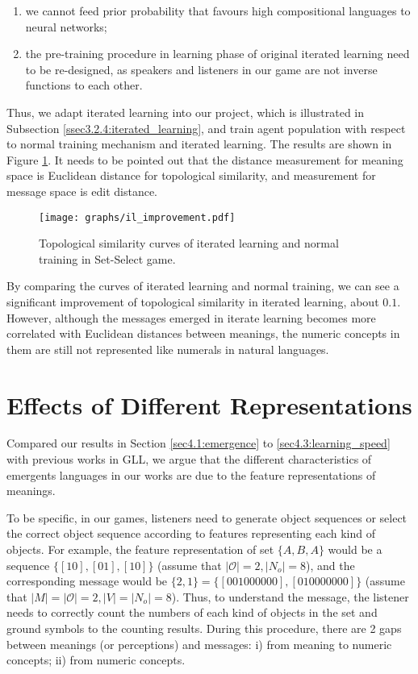 \begin{enumerate}
    \item we cannot feed prior probability that favours high compositional languages to neural networks;
    \item the pre-training procedure in learning phase of original iterated learning need to be re-designed, as speakers and listeners in our game are not inverse functions to each other.
\end{enumerate}

Thus, we adapt iterated learning into our project, which is illustrated in Subsection \ref{ssec3.2.4:iterated_learning}, and train agent population with respect to normal training mechanism and iterated learning. The results are shown in Figure \ref{fig4.4:il_improve}. It needs to be pointed out that the distance measurement for meaning space is Euclidean distance for topological similarity, and measurement for message space is edit distance.

\begin{figure}[!h]
    \centering
    \texttt{[image: graphs/il\_improvement.pdf]}
    \caption{Topological similarity curves of iterated learning and normal training in Set-Select game.}
    \label{fig4.4:il_improve}
\end{figure}

By comparing the curves of iterated learning and normal training, we can see a significant improvement of topological similarity in iterated learning, about $0.1$. However, although the messages emerged in iterate learning becomes more correlated with Euclidean distances between meanings, the numeric concepts in them are still not represented like numerals in natural languages.


\section{Effects of Different Representations}
\label{sec4.4:represent_effect}

Compared our results in Section \ref{sec4.1:emergence} to \ref{sec4.3:learning_speed} with previous works in GLL, we argue that the different characteristics of emergents languages in our works are due to the feature representations of meanings.

To be specific, in our games, listeners need to generate object sequences or select the correct object sequence according to features representing each kind of objects. For example, the feature representation of set $\{A, B, A\}$ would be a sequence $\{[1 0], [0 1], [1 0]\}$ (assume that $|\mathcal{O}|=2, |N_o|=8$), and the corresponding message would be $\{2, 1\}=\{[0 0 1 0 0 0 0 0 0], [0 1 0 0 0 0 0 0 0]\}$ (assume that $|M|=|\mathcal{O}|=2, |V|=|N_o|=8$). Thus, to understand the message, the listener needs to correctly count the numbers of each kind of objects in the set and ground symbols to the counting results. During this procedure, there are 2 gaps between meanings (or perceptions) and messages: i) from meaning to numeric concepts; ii) from numeric concepts.

